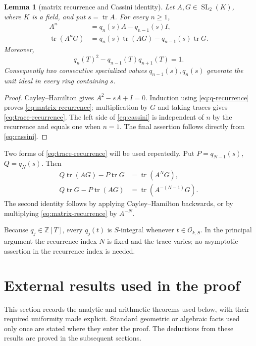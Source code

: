 \documentclass[11pt,reqno]{amsart}
\newtheorem{lemma}[theorem]{Lemma}
\theoremstyle{definition}
\theoremstyle{remark}
\newcommand{\Z}{\mathbb Z}
\newcommand{\cO}{\mathcal O}
\newcommand{\Tr}{\operatorname{tr}}
\newcommand{\SL}{\operatorname{SL}}
\begin{document}
\begin{lemma}[matrix recurrence and Cassini identity]
\label{lem:matrix-recurrence}
Let \(A,G\in\SL_2(K)\), where \(K\) is a field, and put
\(s=\Tr A\).  For every \(n\ge1\),
\begin{align}
 A^n&=q_n(s)A-q_{n-1}(s)I,
 \label{eq:matrix-recurrence}\\
 \Tr(A^nG)&=q_n(s)\Tr(AG)-q_{n-1}(s)\Tr G.
 \label{eq:trace-recurrence}
\end{align}
Moreover,
\begin{equation}\label{eq:cassini}
 q_n(T)^2-q_{n-1}(T)q_{n+1}(T)=1.
\end{equation}
Consequently two consecutive specialized values
\(q_{n-1}(s),q_n(s)\) generate the unit ideal in every ring containing
\(s\).
\end{lemma}

\begin{proof}
Cayley--Hamilton gives \(A^2-sA+I=0\).  Induction using
\eqref{eq:q-recurrence} proves \eqref{eq:matrix-recurrence}; multiplication
by \(G\) and taking traces gives \eqref{eq:trace-recurrence}.  The left side
of \eqref{eq:cassini} is independent of \(n\) by the recurrence and equals
one when \(n=1\).  The final assertion follows directly from
\eqref{eq:cassini}.
\end{proof}

Two forms of \eqref{eq:trace-recurrence} will be used repeatedly.  Put
\(P=q_{N-1}(s)\), \(Q=q_N(s)\).  Then
\begin{align}
 Q\Tr(AG)-P\Tr G&=\Tr(A^NG),
 \label{eq:positive-recurrence-image}\\
 Q\Tr G-P\Tr(AG)&=\Tr(A^{-(N-1)}G).
 \label{eq:negative-recurrence-image}
\end{align}
The second identity follows by applying Cayley--Hamilton backwards, or by
multiplying \eqref{eq:matrix-recurrence} by \(A^{-N}\).

Because \(q_j\in\Z[T]\), every \(q_j(t)\) is \(S\)-integral whenever
\(t\in\cO_{k,S}\).  In the principal argument the recurrence index \(N\)
is fixed and the trace varies; no asymptotic assertion in the recurrence
index is needed.

\section{External results used in the proof}
\label{sec:external-inputs}

This section records the analytic and arithmetic theorems used below, with
their required uniformity made explicit.  Standard geometric or algebraic
facts used only once are stated where they enter the proof.  The deductions
from these results are proved in the subsequent sections.
\end{document}
